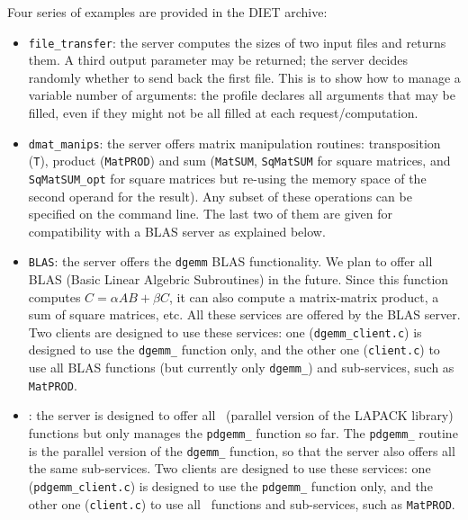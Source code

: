 Four series of examples are provided in the DIET archive:
\begin{itemize}
\item{\texttt{file\_transfer}}: the server computes the sizes of two
  input files and returns them. A third output parameter may be
  returned; the server decides randomly whether to send back the
  first file. This is to show how to manage a variable number of
  arguments: the profile declares all arguments that may be filled,
  even if they might not be all filled at each request/computation.

\item{\texttt{dmat\_manips}}: the server offers matrix manipulation
  routines: transposition (\texttt{T}), product (\texttt{MatPROD}) and
  sum (\texttt{MatSUM}, \texttt{SqMatSUM} for square matrices, and
  \texttt{SqMatSUM\_opt} for square matrices but re-using the memory
  space of the second operand for the result). Any subset of these
  operations can be specified on the command line. The last two of
  them are given for compatibility with a BLAS server as explained below.
  
\item{\texttt{BLAS}}: the server offers the \texttt{dgemm} BLAS
  functionality.  We plan to offer all BLAS (Basic Linear Algebric
  Subroutines) in the future. Since this function computes
  $C = \alpha AB + \beta C$, it can also compute a matrix-matrix
  product, a sum of square matrices, etc. All these services are
  offered by the BLAS server. Two clients are designed to use these
  services: one (\texttt{dgemm\_client.c}) is designed to use the
  \texttt{dgemm\_} function only, and the other one
  (\texttt{client.c}) to use all BLAS functions (but currently only
  \texttt{dgemm\_}) and sub-services, such as \texttt{MatPROD}.
  
\item{\texttt{\scalapack}}: the server is designed to offer all
  \scalapack\  (parallel version of the LAPACK library) functions but
  only manages the \texttt{pdgemm\_} function so far. The
  \texttt{pdgemm\_} routine is the parallel version of the
  \texttt{dgemm\_} function, so that the server also offers all the
  same sub-services. Two clients are designed to use these services:
  one (\texttt{pdgemm\_client.c}) is designed to use the
  \texttt{pdgemm\_} function only, and the other one
  (\texttt{client.c}) to use all \scalapack\ functions and
  sub-services, such as \texttt{MatPROD}.
\end{itemize}

